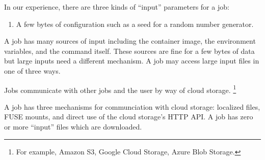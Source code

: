 \documentclass[10pt,a4paper%
]{article}
\begin{document}
In our experience, there are three kinds of ``input'' parameters for a job:
\begin{enumerate}
\item A few bytes of configuration such as a seed for a random number generator.
\end{enumerate}

A job has many sources of input including the container image, the environment variables, and the command itself.
These sources are fine for a few bytes of data but large inputs need a different mechanism.
A job may access large input files in one of three ways.


Jobs communicate with other jobs and the user by way of cloud storage.%
\footnote{For example, Amazon S3, Google Cloud Storage, Azure Blob Storage.}


A job has three mechanisms for communciation with cloud storage: localized files, FUSE mounts, and direct use of the cloud storage's HTTP API.
A job has zero or more ``input'' files which are downloaded.
\end{document}
